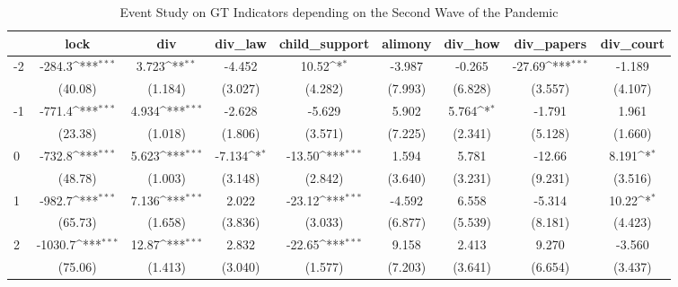 \documentclass{article}
\begin{document}
{
\def\sym#1{\ifmmode^{#1}\else\(^{#1}\)\fi}
\begin{longtable}{l*{8}{c}}
\caption{Event Study on GT Indicators depending on the Second Wave of the Pandemic}\\
\hline\hline\endfirsthead\hline\endhead\hline\endfoot\endlastfoot
                &\multicolumn{1}{c}{lock}&\multicolumn{1}{c}{div}&\multicolumn{1}{c}{div\_law}&\multicolumn{1}{c}{child\_support}&\multicolumn{1}{c}{alimony}&\multicolumn{1}{c}{div\_how}&\multicolumn{1}{c}{div\_papers}&\multicolumn{1}{c}{div\_court}\\
\hline
-2              &   -284.3\sym{***}&    3.723\sym{**} &   -4.452         &    10.52\sym{*}  &   -3.987         &   -0.265         &   -27.69\sym{***}&   -1.189         \\
                &  (40.08)         &  (1.184)         &  (3.027)         &  (4.282)         &  (7.993)         &  (6.828)         &  (3.557)         &  (4.107)         \\
-1              &   -771.4\sym{***}&    4.934\sym{***}&   -2.628         &   -5.629         &    5.902         &    5.764\sym{*}  &   -1.791         &    1.961         \\
                &  (23.38)         &  (1.018)         &  (1.806)         &  (3.571)         &  (7.225)         &  (2.341)         &  (5.128)         &  (1.660)         \\
0               &   -732.8\sym{***}&    5.623\sym{***}&   -7.134\sym{*}  &   -13.50\sym{***}&    1.594         &    5.781         &   -12.66         &    8.191\sym{*}  \\
                &  (48.78)         &  (1.003)         &  (3.148)         &  (2.842)         &  (3.640)         &  (3.231)         &  (9.231)         &  (3.516)         \\
1               &   -982.7\sym{***}&    7.136\sym{***}&    2.022         &   -23.12\sym{***}&   -4.592         &    6.558         &   -5.314         &    10.22\sym{*}  \\
                &  (65.73)         &  (1.658)         &  (3.836)         &  (3.033)         &  (6.877)         &  (5.539)         &  (8.181)         &  (4.423)         \\
2               &  -1030.7\sym{***}&    12.87\sym{***}&    2.832         &   -22.65\sym{***}&    9.158         &    2.413         &    9.270         &   -3.560         \\
                &  (75.06)         &  (1.413)         &  (3.040)         &  (1.577)         &  (7.203)         &  (3.641)         &  (6.654)         &  (3.437)         \\

\end{longtable}}
\end{document}
